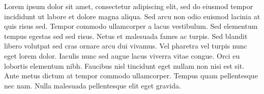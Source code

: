 
Lorem ipsum dolor sit amet, consectetur adipiscing elit, sed do eiusmod tempor incididunt ut labore et dolore magna aliqua. Sed arcu non odio euismod lacinia at quis risus sed. Tempor commodo ullamcorper a lacus vestibulum. Sed elementum tempus egestas sed sed risus. Netus et malesuada fames ac turpis. Sed blandit libero volutpat sed cras ornare arcu dui vivamus. Vel pharetra vel turpis nunc eget lorem dolor. Iaculis nunc sed augue lacus viverra vitae congue. Orci eu lobortis elementum nibh. Faucibus nisl tincidunt eget nullam non nisi est sit. Ante metus dictum at tempor commodo ullamcorper. Tempus quam pellentesque nec nam. Nulla malesuada pellentesque elit eget gravida.


